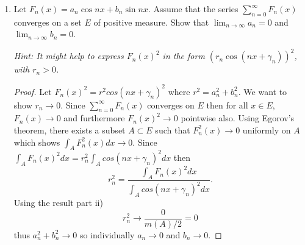 \documentclass[12pt]{article}
\begin{document}
\begin{enumerate}
\begin{enumerate}[label=(\roman*)]
		            \begin{proof}
			            To begin use the trig identity for $cos^2(\theta)$ such that $cos^2(nx+\gamma_n) = \frac{1 + cos(2nx+2\gamma_n)}{2}.$ Then $\int_E cos^2(nx+\gamma_n)dx = \frac{m(E)}{2} + \frac{1}{2} \int_E cos(2nx + 2\gamma_n)dx.$ Using euler's formula notice $cos(2nx+2\gamma_n) = Re(e^{2nx}e^{2\gamm_n})$ so by substitution $\int_E cos(2nx + 2\gamma_n)dx = Re(e^{2\gamma_n}\int_E e^{2nx}dx) \leq |\int e^{2inx}dx|$ since $|e^{2i\gamma_n}| = 1$. By part i),
			            $$\lim_{n\to\infy}\int_E e^{2inx}dx = 0$$ so
			            $$\int_E cos(2nx+2\gamma_n)dx \to 0$$
			            since $E\subset [0,2\pi]$.
			            By substitution, $\lim_{n\to\infy}\int_E cos^2(nx+\gamma_n)dx = \frac{m(E)}{2}.$
		            \end{proof}

		      \item Let $F_n(x) = a_n \cos nx + b_n \sin nx$. Assume that the series $\sum_{n=0}^\infty F_n(x)$ converges on a set $E$ of positive measure. Show that $\lim_{n\to\infty} a_n = 0$ and $\lim_{n\to\infty} b_n = 0$.

		            \textit{Hint: It might help to express $F_n(x)^2$ in the form $(r_n \cos(nx + \gamma_n))^2$, with $r_n > 0$.}

		            \begin{proof}
			            Let $F_n(x)^2 = r^2cos(nx+\gamma_n)^2$ where $r^2 = a_n^2+b_n^2$. We want to show $r_n\to 0$. Since $\sum_{n=0}^\infty F_n(x)$ converges on $E$ then for all $x\in E$, $F_n(x)\to 0$ and furthermore $F_n(x)^2\to 0$ pointwise also. Using Egorov's theorem, there exists a subset $A\subset E$ such that $F_n^2(x) \to 0$ uniformly on $A$ which shows $\int_A F_n^2(x)dx \to 0$.
			            Since $\int_A F_n(x)^2dx = r_n^2\int_A cos(nx+\gamma_n)^2dx$ then
			            $$r_n^2 = \frac{\int_A F_n(x)^2dx}{\int_A cos(nx+\gamma_n)^2dx}.$$
			            Using the result part ii)
			            $$r_n^2 \to \frac{0}{m(A)/2} = 0$$
			            thus $a_n^2+b_n^2 \to 0$ so individually $a_n\to 0$ and $b_n \to 0$.
		            \end{proof}
	      \end{enumerate}

\end{enumerate}
\end{document}
